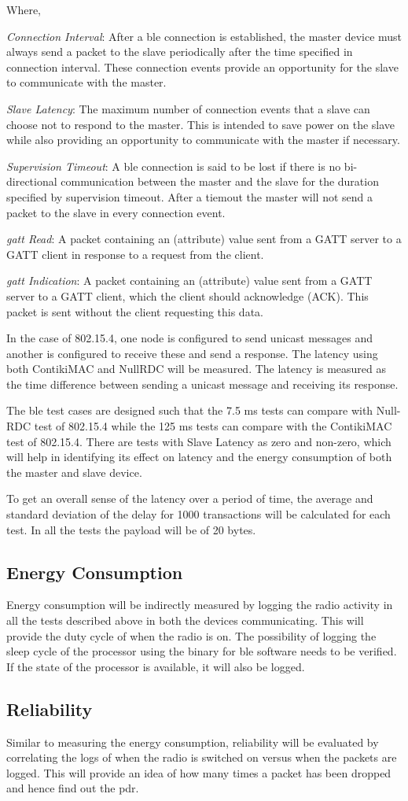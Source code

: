 Where,

\emph{Connection Interval}: After a \gls{ble} connection is established, the master device must always send a packet to the slave periodically after the time specified in connection interval. These connection events provide an opportunity for the slave to communicate with the master.

\emph{Slave Latency}: The maximum number of connection events that a slave can choose not to respond to the master. This is intended to save power on the slave while also providing an opportunity to communicate with the master if necessary.

\emph{Supervision Timeout}: A \gls{ble} connection is said to be lost if there is no bi-directional communication between the master and the slave for the duration specified by supervision timeout. After a tiemout the master will not send a packet to the slave in every connection event.

\emph{\gls{gatt} Read}: A packet containing an (attribute) value sent from a GATT server to a GATT client in response to a request from the client.

\emph{\gls{gatt} Indication}: A packet containing an (attribute) value sent from a GATT server to a GATT client, which the client should acknowledge (ACK). This packet is sent without the client requesting this data.

In the case of 802.15.4, one node is configured to send unicast messages and another is configured to receive these and send a response. The latency using both ContikiMAC and NullRDC will be measured. The latency is measured as the time difference between sending a unicast message and receiving its response.

The \gls{ble} test cases are designed such that the 7.5 \si{\milli\second} tests can compare with Null-RDC test of 802.15.4 while the 125 \si{\milli\second} tests can compare with the  ContikiMAC test of 802.15.4. There are tests with Slave Latency as zero and non-zero, which will help in identifying its effect on latency and the energy consumption of both the master and slave device.

To get an overall sense of the latency over a period of time, the average and standard deviation of the delay for 1000 transactions will be calculated for each test. In all the tests the payload will be of 20 bytes.

\subsection{Energy Consumption}
Energy consumption will be indirectly measured by logging the radio activity in all the tests described above in both the devices communicating. This will provide the duty cycle of when the radio is on. The possibility of logging the sleep cycle of the processor using the binary for \gls{ble} software needs to be verified. If the state of the processor is available, it will also be logged.

\subsection{Reliability}
Similar to measuring the energy consumption, reliability will be evaluated by  correlating the logs of when the radio is switched on versus when the packets are logged. This will provide an idea of how many times a packet has been dropped and hence find out the \gls{pdr}.
